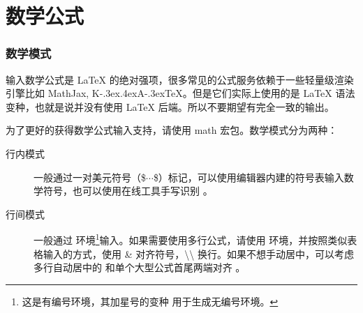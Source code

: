 {\section{数学公式}
\begin{frame}
  \frametitle{数学模式}
  \begin{alertblock}{}
  输入数学公式是 \LaTeX{} 的绝对强项，很多常见的公式服务依赖于一些轻量级渲染引擎比如 MathJax, K\kern-.3ex\raise.4ex\hbox{\footnotesize A}\kern-.3ex\TeX{}。但是它们实际上使用的是 \LaTeX{} 语法变种，也就是说并没有使用 \LaTeX{} 后端。所以不要期望有完全一致的输出。
  \end{alertblock}
  
  为了更好的获得数学公式输入支持，请使用 math 宏包。数学模式分为两种：
  \begin{description}
    \item[行内模式] 一般通过一对美元符号（\$$\cdots$\$）标记，可以使用编辑器内建的符号表输入数学符号，也可以使用在线工具手写识别 。
    \item[行间模式] 一般通过  环境\footnote{这是有编号环境，其加星号的变种  用于生成无编号环境。}输入。如果需要使用多行公式，请使用  环境，并按照类似表格输入的方式，使用 \& 对齐符号，\textbackslash\textbackslash{} 换行。如果不想手动居中，可以考虑多行自动居中的  和单个大型公式首尾两端对齐 。
  \end{description}
\end{frame}

}
